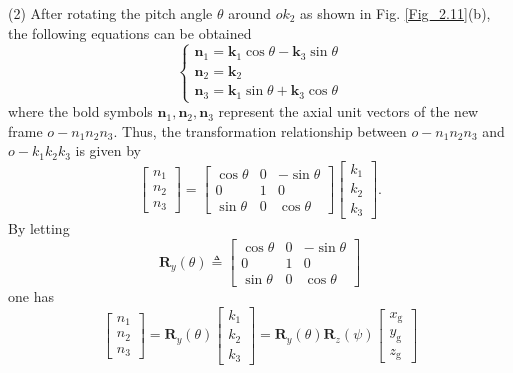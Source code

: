 (2) After rotating the pitch angle $\theta$ around $o{{k}_{2}}$
as shown in Fig. \ref{Fig_2.11}(b), the following equations can be
obtained
\begin{equation}
\left\{ \begin{array}{l}
{{\mathbf{n}}_{1}}={{\mathbf{k}}_{1}}\cos\theta-{{\mathbf{k}}_{3}}\sin\theta\\
{{\mathbf{n}}_{2}}={{\mathbf{k}}_{2}}\\
{{\mathbf{n}}_{3}}={{\mathbf{k}}_{1}}\sin\theta+{{\mathbf{k}}_{3}}\cos\theta
\end{array}\right.\label{eq:2.5}
\end{equation}
where the bold symbols $\mathbf{n}_{1},\mathbf{n}_{2},\mathbf{n}_{3}$
represent the axial unit vectors of the new frame $o-{{n}_{1}}{{n}_{2}}{{n}_{3}}$.
Thus, the transformation relationship between $o-{{n}_{1}}{{n}_{2}}{{n}_{3}}$
and $o-{{k}_{1}}{{k}_{2}}{{k}_{3}}$ is given by
\begin{equation}
\left[{\begin{array}{c}
	{n_{1}}\\
	{n_{2}}\\
	{n_{3}}
	\end{array}}\right]=\left[{\begin{array}{ccc}
	{\cos\theta} & 0 & {-\sin\theta}\\
	0 & 1 & 0\\
	{\sin\theta} & 0 & {\cos\theta}
	\end{array}}\right]\left[\begin{array}{l}
{k_{1}}\\
{k_{2}}\\
{k_{3}}
\end{array}\right].\label{eq:2.6}
\end{equation}
By letting 
\begin{equation}
{{\mathbf{R}}_{y}}\left(\theta\right)\triangleq\left[\begin{array}{ccc}
\cos\theta & 0 & -\sin\theta\\
0 & 1 & 0\\
\sin\theta & 0 & \cos\theta
\end{array}\right]\label{eq:2.7}
\end{equation}
one has
\begin{equation}
\left[{\begin{array}{c}
	{n_{1}}\\
	{n_{2}}\\
	{n_{3}}
	\end{array}}\right]={\mathbf{R}_{y}}\left(\theta\right)\left[\begin{array}{l}
{k_{1}}\\
{k_{2}}\\
{k_{3}}
\end{array}\right]={\mathbf{R}_{y}}\left(\theta\right){\mathbf{R}_{z}}\left(\psi\right)\left[{\begin{array}{c}
	{x_{\text{g}}}\\
	{y_{\text{g}}}\\
	{z_{\text{g}}}
	\end{array}}\right]\label{2.8}
\end{equation}

